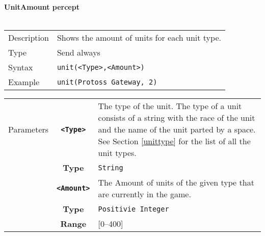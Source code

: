 \newpage
\noindent
\textbf{UnitAmount percept}\\
\\
\begin{tabularx}{\textwidth}{lX}
 Description & Shows the amount of units for each unit type. \\
 Type & Send always \\
 Syntax & \verb|unit(<Type>,<Amount>)| \\
 Example & \verb|unit(Protoss Gateway, 2)| \\ 
 \end{tabularx}
 \begin{tabularx}{\textwidth}{l | c | p{8cm}|}
 \cline{2-3} 
 Parameters & \textbf{\verb|<Type>|} & The type of the unit. The type of a unit consists of a string with the race            of the unit and the name of the unit parted by a space. See Section \ref{unittype} for the list of               all the unit types. \\
            & \textbf{Type} & \verb|String| \\
            \cline{2-3} 
            & \textbf{\verb|<Amount>|} & The Amount of units of the given type that are currently in the game.\\ 
            & \textbf{Type} & \verb|Positivie Integer| \\
            & \textbf{Range} & [0--400] \\
            \cline{2-3} 
\end{tabularx}\\

